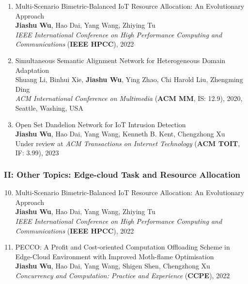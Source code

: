 \documentclass[letterpaper,11pt]{article}
\begin{document}
\begin{enumerate}
  \item Multi-Scenario Bimetric-Balanced IoT Resource Allocation: An Evolutionary Approach\\
  \textbf{Jiashu Wu}, Hao Dai, Yang Wang\textsuperscript{\Letter}, Zhiying Tu\\
  \textit{IEEE International Conference on High Performance Computing and Communications} (\textbf{IEEE HPCC}), 2022

  \item Simultaneous Semantic Alignment Network for Heterogeneous Domain Adaptation\\
  Shuang Li, Binhui Xie, \textbf{Jiashu Wu}, Ying Zhao, Chi Harold Liu\textsuperscript{\Letter}, Zhengming Ding\\
  \textit{ACM International Conference on Multimedia} (\textbf{ACM MM}, IS: 12.9), 2020, Seattle, Washing, USA

  \item Open Set Dandelion Network for IoT Intrusion Detection\\
  \textbf{Jiashu Wu}, Hao Dai, Yang Wang\textsuperscript{\Letter}, Kenneth B. Kent, Chengzhong Xu\\
  Under review at \textit{ACM Transactions on Internet Technology} (\textbf{ACM TOIT}, IF: 3.99), 2023
\end{enumerate}

\iffalse
\subsubsection*{II: Other Topics: Edge-cloud Task and Resource Allocation}
\begin{enumerate}
  \setcounter{enumi}{9}
  \item Multi-Scenario Bimetric-Balanced IoT Resource Allocation: An Evolutionary Approach\\
  \textbf{Jiashu Wu}, Hao Dai, Yang Wang\textsuperscript{\Letter}, Zhiying Tu\\
  \textit{IEEE International Conference on High Performance Computing and Communications} (\textbf{IEEE HPCC}), 2022

  \item PECCO: A Profit and Cost-oriented Computation Offloading Scheme in Edge-Cloud Environment with Improved Moth-flame Optimisation\\
  \textbf{Jiashu Wu}, Hao Dai, Yang Wang\textsuperscript{\Letter}, Shigen Shen, Chengzhong Xu\\
  \textit{Concurrency and Computation: Practice and Experience} (\textbf{CCPE}), 2022
\end{enumerate}
\end{document}
